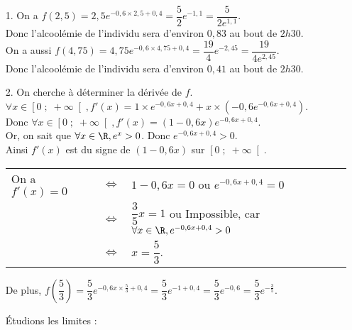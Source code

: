 \begin{itemize}
\item[1.] On a $f\left(2,5\right) = 2,5e^{-0,6\times 2,5 + 0,4} = \dfrac{5}{2}e^{-1,1} = \dfrac{5}{2e^{1,1}}$. \\

Donc l'alcoolémie de l'individu sera d'environ $0,83$ au bout de $2h30$. \\

On a aussi $f\left(4,75\right) = 4,75e^{-0,6\times 4,75 + 0,4} = \dfrac{19}{4}e^{-2,45} = \dfrac{19}{4e^{2,45}}$. \\

Donc l'alcoolémie de l'individu sera d'environ $0,41$ au bout de $2h30$. \\

\item[2.] On cherche à déterminer la dérivée de $f$. \\

$\forall x \in \left[0 \; ; \; +\infty\right[, f'(x) = 1 \times e^{-0,6x + 0,4} + x \times \left(-0,6e^{-0,6x + 0,4}\right)$. \\

Donc $\forall x \in \left[0 \; ; \; +\infty\right[, f'(x) = \left(1-0,6x\right)e^{-0,6x + 0,4}$. \\

Or, on sait que $\forall x \in \R, e^x > 0$. Donc $e^{-0,6x + 0,4} > 0$. \\

Ainsi $f'(x)$ est du signe de $\left(1-0,6x\right)$ sur $\left[0 \; ; \; +\infty\right[$. \\

\begin{tabular}{lll}
\hspace*{-.3cm} On a $f'(x) = 0$ & $\Longleftrightarrow$ & $1 - 0,6x = 0$ ou $e^{-0,6x + 0,4} = 0$ \\
& $\Longleftrightarrow$ & $\dfrac{3}{5}x = 1$ ou Impossible, car $\forall x \in \R, e^{-0,6x + 0,4} > 0$ \\
& $\Longleftrightarrow$ & $x = \dfrac{5}{3}$. \\
\end{tabular}

De plus, $f\left(\dfrac{5}{3}\right) = \dfrac{5}{3}e^{-0,6x \times \frac{5}{3} + 0,4} = \dfrac{5}{3}e^{-1 + 0,4} = \dfrac{5}{3}e^{-0,6} = \dfrac{5}{3}e^{-\frac{3}{5}}$. 

\newpage

Étudions les limites : \\


\end{itemize}

